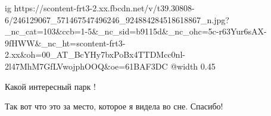  
 
 
 
 

\ifcmt
  ig https://scontent-frt3-2.xx.fbcdn.net/v/t39.30808-6/246129067_571467547496246_924884284518618867_n.jpg?_nc_cat=103&ccb=1-5&_nc_sid=b9115d&_nc_ohc=5c-r63Yur6sAX-9fHWW&_nc_ht=scontent-frt3-2.xx&oh=00_AT_BcYHy7bxPoBx4TTDMcc0nl-2l47MhM7GfLVwojphOOQ&oe=61BAF3DC
  @width 0.45
\fi


Какой интересный парк !

Так вот что это за место, которое я видела во сне. Спасибо!

